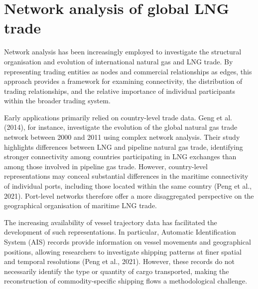 \documentclass[pdftex,12pt,openright,a4paper,oneside]{book}
\begin{document}
\section{Network analysis of global LNG trade}
\label{sec:literature_network_analysis}

Network analysis has been increasingly employed to investigate the structural organisation and evolution of international natural gas and LNG trade. By representing trading entities as nodes and commercial relationships as edges, this approach provides a framework for examining connectivity, the distribution of trading relationships, and the relative importance of individual participants within the broader trading system.

Early applications primarily relied on country-level trade data. Geng et al. (2014), for instance, investigate the evolution of the global natural gas trade network between 2000 and 2011 using complex network analysis. Their study highlights differences between LNG and pipeline natural gas trade, identifying stronger connectivity among countries participating in LNG exchanges than among those involved in pipeline gas trade. However, country-level representations may conceal substantial differences in the maritime connectivity of individual ports, including those located within the same country (Peng et al., 2021). Port-level networks therefore offer a more disaggregated perspective on the geographical organisation of maritime LNG trade.

The increasing availability of vessel trajectory data has facilitated the development of such representations. In particular, Automatic Identification System (AIS) records provide information on vessel movements and geographical positions, allowing researchers to investigate shipping patterns at finer spatial and temporal resolutions (Peng et al., 2021). However, these records do not necessarily identify the type or quantity of cargo transported, making the reconstruction of commodity-specific shipping flows a methodological challenge.
\end{document}
